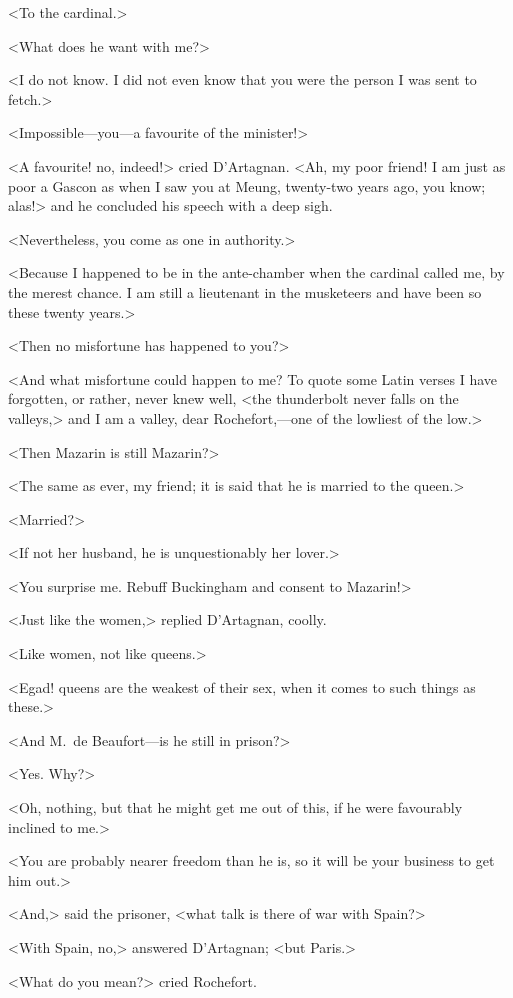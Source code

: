 <To the cardinal.>

<What does he want with me?>

<I do not know. I did not even know that you were the person I was sent to fetch.>

<Impossible—you—a favourite of the minister!>

<A favourite! no, indeed!> cried D'Artagnan. <Ah, my poor friend! I am just as poor a Gascon as when I saw you at Meung, twenty-two years ago, you know; alas!> and he concluded his speech with a deep sigh.

<Nevertheless, you come as one in authority.>

<Because I happened to be in the ante-chamber when the cardinal called me, by the merest chance. I am still a lieutenant in the musketeers and have been so these twenty years.>

<Then no misfortune has happened to you?>

<And what misfortune could happen to me? To quote some Latin verses I have forgotten, or rather, never knew well, <the thunderbolt never falls on the valleys,> and I am a valley, dear Rochefort,—one of the lowliest of the low.>

<Then Mazarin is still Mazarin?>

<The same as ever, my friend; it is said that he is married to the queen.>

<Married?>

<If not her husband, he is unquestionably her lover.>

<You surprise me. Rebuff Buckingham and consent to Mazarin!>

<Just like the women,> replied D'Artagnan, coolly.

<Like women, not like queens.>

<Egad! queens are the weakest of their sex, when it comes to such things as these.>

<And M.~de Beaufort—is he still in prison?>

<Yes. Why?>

<Oh, nothing, but that he might get me out of this, if he were favourably inclined to me.>

<You are probably nearer freedom than he is, so it will be your business to get him out.>

<And,> said the prisoner, <what talk is there of war with Spain?>

<With Spain, no,> answered D'Artagnan; <but Paris.>

<What do you mean?> cried Rochefort.

